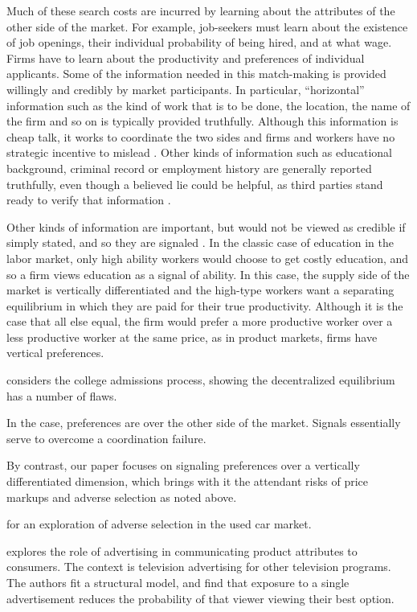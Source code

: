 Much of these search costs are incurred by learning about the attributes of the other side of the market.
For example, job-seekers must learn about the existence of job openings, their individual probability of being hired, and at what wage.
Firms have to learn about the productivity and preferences of individual applicants. 
Some of the information needed in this match-making is provided willingly and credibly by market participants.
In particular, ``horizontal'' information such as the kind of work that is to be done, the location, the name of the firm and so on is typically provided truthfully.
Although this information is cheap talk, it works to coordinate the two sides and firms and workers have no strategic incentive to mislead \citep{farrell1996cheap}.
Other kinds of information such as educational background, criminal record or employment history are generally reported truthfully, even though a believed lie could be helpful, as third parties stand ready to verify that information \citep{autor2008economics}. 

Other kinds of information are important, but would not be viewed as credible if simply stated, and so they are signaled \citep{spence1973job}.  
In the classic case of education in the labor market, only high ability workers would choose to get costly education, and so a firm views education as a signal of ability.
In this case, the supply side of the market is vertically differentiated and the high-type workers want a separating equilibrium in which they are paid for their true productivity. 
Although it is the case that all else equal, the firm would prefer a more productive worker over a less productive worker at the same price, as in product markets, firms have vertical preferences.

\cite{che2016} considers the college admissions process, showing the decentralized equilibrium has a number of flaws.

In the \cite{coles2013preference} case, preferences are over the other side of the market.
Signals essentially serve to overcome a coordination failure. 

By contrast, our paper focuses on signaling preferences over a vertically differentiated dimension, which brings with it the attendant risks of price markups and adverse selection as noted above.  


\cite{tadelis2011information}
\cite{Genesove1993} for an exploration of adverse selection in the used car market. 

\cite{anand2011} explores the role of advertising in communicating product attributes to consumers. 
The context is television advertising for other television programs.
The authors fit a structural model, and find that exposure to a single advertisement reduces the probability of that viewer viewing their best option. 


